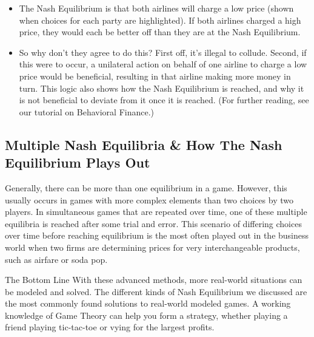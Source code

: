\documentclass[]{report}
\begin{document}
\begin{itemize}
	\item The Nash Equilibrium is that both airlines will charge a low price (shown when choices for each party are highlighted). If both airlines charged a high price, they would each be better off than they are at the Nash Equilibrium.
	
\item So why don't they agree to do this? First off, it's illegal to collude. Second, if this were to occur, a unilateral action on behalf of one airline to charge a low price would be beneficial, resulting in that airline making more money in turn. This logic also shows how the Nash Equilibrium is reached, and why it is not beneficial to deviate from it once it is reached. (For further reading, see our tutorial on Behavioral Finance.)
\end{itemize}


\subsection{Multiple Nash Equilibria \& How The Nash Equilibrium Plays Out}
Generally, there can be more than one equilibrium in a game. However, this usually occurs in games with more complex elements than two choices by two players. In simultaneous games that are repeated over time, one of these multiple equilibria is reached after some trial and error. This scenario of differing choices over time before reaching equilibrium is the most often played out in the business world when two firms are determining prices for very interchangeable products, such as airfare or soda pop.

The Bottom Line
With these advanced methods, more real-world situations can be modeled and solved. The different kinds of Nash Equilibrium we discussed are the most commonly found solutions to real-world modeled games. A working knowledge of Game Theory can help you form a strategy, whether playing a friend playing tic-tac-toe or vying for the largest profits.
\end{document}
